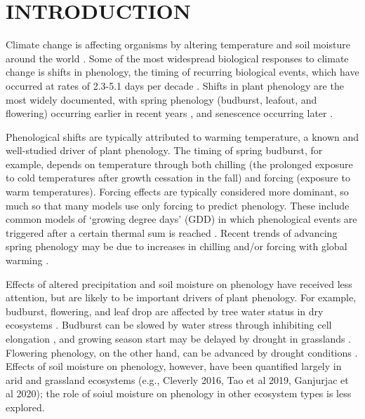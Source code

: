 \documentclass{article}
\begin{document}
\section* {INTRODUCTION} 
\par Climate change is affecting organisms by altering temperature and soil moisture around the world \citep{parmesan2006,chen2011}. Some of the most widespread biological responses to climate change is shifts in phenology, the timing of recurring biological events, which have occurred at rates of 2.3-5.1 days per decade \citep{parmesan2006,poloczanska2013,root2003}. Shifts in plant phenology are the most widely documented, with spring phenology (budburst, leafout, and flowering) occurring earlier in recent years \citep{wolkovich2012}, and senescence occurring later \citep{taylor2008,delpierre2009}. 
\par Phenological shifts are typically attributed to warming temperature, a known and well-studied driver of plant phenology. The timing of spring budburst, for example, depends on temperature through both chilling (the prolonged exposure to cold temperatures after growth cessation in the fall) and forcing (exposure to warm temperatures). Forcing effects are typically considered more dominant, so much so that many models use only forcing to predict phenology. These include common models of `growing degree days' (GDD) in which phenological events are triggered after a certain thermal sum is reached \citep[e.g., ][]{olsson2014process}. Recent trends of advancing spring phenology may be due to increases in chilling and/or forcing with global warming \citep{fujisawa2010, ibanez2010,cook2012b}. %
\par Effects of altered precipitation and soil moisture on phenology have received less attention, but are likely to be important drivers of plant phenology. For example, budburst, flowering, and leaf drop are affected by tree water status in dry ecosystems \citep[e.g., ][]{essiamah1986,reich1984, van1993}. Budburst can be slowed by water stress through inhibiting cell elongation \citep{essiamah1986}, and growing season start may be delayed by drought in grasslands \cite{cui2017}. Flowering phenology, on the other hand, can be advanced by drought conditions \citep{hamann2018}. Effects of soil moisture on phenology, however, have been quantified largely in arid and grassland ecosystems (e.g., Cleverly 2016, Tao et al 2019, Ganjurjac et al 2020); the role of soiul moisture on phenology in other ecosystem types is less explored. 
\end{document}
